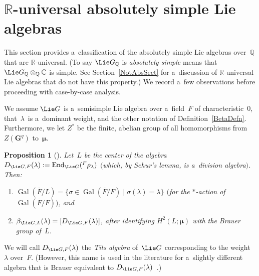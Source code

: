 \documentclass[pdftex]{sigma}
\DeclareMathOperator{\Gal}{Gal}
\numberwithin{equation}{section}
\newtheorem{prop}{Proposition}[section]
\begin{document}
\section[$\mathbb{R}$-universal absolutely simple Lie algebras]{$\boldsymbol{\mathbb{R}}$-universal absolutely simple Lie algebras}\label{WhichRUnivSect}

This section provides a~classif\/ication of the absolutely simple Lie algebras over~$\mathbb{Q}$ that
are $\mathbb{R}$-universal.
(To say $\Lie G_\mathbb{Q}$ is \emph{absolutely simple} means that $\Lie G_\mathbb{Q} \otimes_\mathbb{Q} \mathbb{C}$ is
simple.
See Section~\ref{NotAbsSect} for a~discussion of $\mathbb{R}$-universal Lie algebras that do not have this property.) We record
a~few observations before proceeding with case-by-case analysis.

\begin{notation}
We assume $\Lie G$ is a~semisimple Lie algebra over a~f\/ield~$F$ of characteristic~$0$, that~$\lambda$~is a~dominant
weight, and the other notation of Def\/inition~\ref{BetaDefn}.
Furthermore, we let $Z^*$ be the f\/inite, abelian group of all homomorphisms from $Z(\mathbf{G}^q)$ to~$\boldsymbol\mu$.
\end{notation}

\begin{prop}[]\label{Beta=D}
Let~$L$ be the center of the algebra $D_{\Lie G, F}(\lambda):= \mathrm{End}_{\Lie G}({}^F \rho_\lambda)$ $($which,
by Schur's lemma, is a~division algebra$)$.
Then:
\renewcommand{\labelenumi}{{\rm (\theenumi)}}
\begin{enumerate}\itemsep=0pt
\item
\label{Beta=D-invt}
$\Gal(\overline{F}/L) = \{ \sigma \in \Gal(\overline{F}/F) \mid \sigma(\lambda) = \lambda \}$ $($for the $*$-action
of $\Gal(\overline{F}/F))$, and
\item $\beta_{\Lie G, L}(\lambda) = [D_{\Lie G, F}(\lambda)]$, after identifying $H^2(L; \boldsymbol\mu)$ with the
Brauer group of~$L$.
\end{enumerate}
\end{prop}

\begin{defn}
We will call $D_{\Lie G, F}(\lambda)$ the \emph{Tits algebra} of~$\Lie G$ corresponding to the weight~$\lambda$
over~$F$.
(However, this name is used in the literature for a~slightly dif\/ferent algebra that is Brauer equivalent to $D_{\Lie G,
F}(\lambda)$~\cite[\S~27A, p.~377]{KnusEtAl-BookOfInvols}.)
\end{defn}
\end{document}
